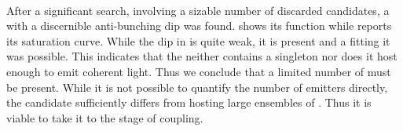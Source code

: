 				\\
				After a significant search, involving a sizable number of discarded candidates, a \nd with a discernible anti-bunching dip was found.  shows its \gtf function while  reports its saturation curve. While the dip in \gtf is quite weak, it is present and a fitting it was possible. This indicates that the \nd neither contains a singleton \siv nor does it host enough \sivs to emit coherent light. Thus we conclude that a limited number of \sivs must be present. While it is not possible to quantify the number of emitters directly, the candidate sufficiently differs from \nds hosting large ensembles of \sivs. Thus it is viable to take it to the stage of coupling.

				\begin{figure}[htp]
					\begin{subfigure}[t]{ 0.49\linewidth}
						\centering
						\caption{}
						\label{subfig::single_siv_g2_before_transfer_antenna}
					\end{subfigure}
					\hfill
					\begin{subfigure}[t]{ 0.49\linewidth}
						\centering

\end{subfigure}
\end{figure}
